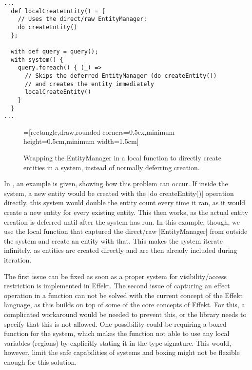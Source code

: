 \newsavebox{\localfunctionwrap}
\begin{lrbox}{\localfunctionwrap}
\begin{lstlisting}
...
  def localCreateEntity() = {
    // Uses the direct/raw EntityManager:
    do createEntity()
  };

  with def query = query();
  with system() {
    query.foreach() { (_) =>
	  // Skips the deferred EntityManager (do createEntity())
	  // and creates the entity immediately
      localCreateEntity()
    }
  }
...
\end{lstlisting}
\end{lrbox}

\begin{figure}[h!]
\centering
{}=[rectangle,draw,rounded corners=0.5ex,minimum height=0.5cm,minimum width=1.5cm]
\caption{Wrapping the EntityManager in a local function to directly create entities in a system, instead of normally deferring creation.}
\label{fig:localfunctionwrap}
\end{figure}

In , an example is given, showing how this problem can occur. If inside the system, a new entity would be created with the |do createEntity()| operation directly, this system would double the entity count every time it ran, as it would create a new entity for every existing entity. This then works, as the actual entity creation is deferred until after the system has run. In this example, though, we use the local function that captured the direct/raw |EntityManager| from outside the system and create an entity with that. This makes the system iterate infinitely, as entities are created directly and are then already included during iteration.

The first issue can be fixed as soon as a proper system for visibility/access restriction is implemented in Effekt. The second issue of capturing an effect operation in a function can not be solved with the current concept of the Effekt language, as this builds on top of some of the core concepts of Effekt. For this, a complicated workaround would be needed to prevent this, or the library needs to specify that this is not allowed. One possibility could be requiring a boxed function for the system, which makes the function not able to use any local variables (regions) by explicitly stating it in the type signature. This would, however, limit the safe capabilities of systems and boxing might not be flexible enough for this solution.


